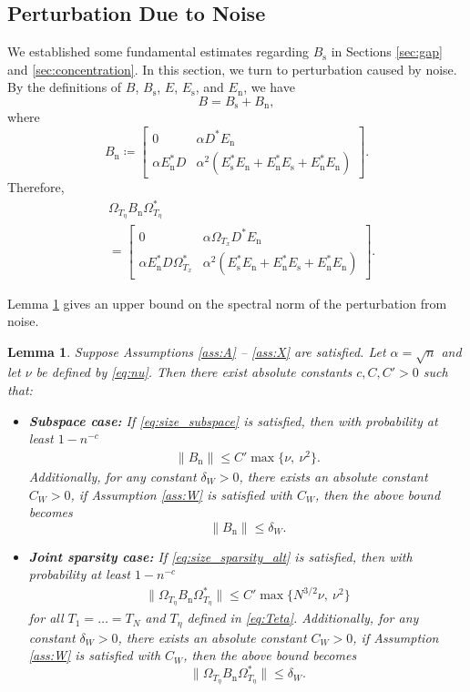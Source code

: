 \documentclass[11pt,journal]{IEEEtran}
\newcommand{\rms}{\mathrm{s}}
\newcommand{\rmn}{\mathrm{n}}
\newcommand{\norm}[1]{\|{#1}\|}
\newtheorem{lemma}[theorem]{Lemma}
\begin{document}
\subsection{Perturbation Due to Noise} \label{sec:noise}

We established some fundamental estimates regarding $B_\rms$ in Sections \ref{sec:gap} and \ref{sec:concentration}. In this section, we turn to perturbation caused by noise. By the definitions of $B$, $B_\rms$, $E$, $E_\rms$, and $E_\rmn$, we have
\[
B = B_\rms + B_\rmn,
\]
where
\[
B_\rmn \coloneqq 
\begin{bmatrix}
0 & \alpha D^* E_\rmn \\
\alpha E_\rmn^*D & \alpha^2 (E_\rms^*E_\rmn + E_\rmn^* E_\rms + E_\rmn^* E_\rmn)
\end{bmatrix}.
\]
Therefore,
\begin{align*}
& \Omega_{T_\eta}B_\rmn \Omega_{T_\eta}^* \\
& = \begin{bmatrix}
0 & \alpha \Omega_{T_x} D^* E_\rmn \\
\alpha E_\rmn^*D \Omega_{T_x}^* & \alpha^2 (E_\rms^*E_\rmn + E_\rmn^* E_\rms + E_\rmn^* E_\rmn)
\end{bmatrix}.
\end{align*}

Lemma \ref{lem:Bn} gives an upper bound on the spectral norm of the perturbation from noise.

\begin{lemma} \label{lem:Bn}
Suppose Assumptions \ref{ass:A} -- \ref{ass:X} are satisfied. Let $\alpha =\sqrt{n}$ and let $\nu$ be defined by \eqref{eq:nu}. Then there exist absolute constants $c,C,C'>0$ such that:
\begin{itemize}
	\item \textbf{Subspace case:} If  \eqref{eq:size_subspace} is satisfied, then with probability at least $1 - n^{-c}$
\begin{align*}
\norm{B_\rmn} \leq C' \max \{\nu,~\nu^2 \}.
\end{align*}
Additionally, for any constant $\delta_W >0$, there exists an absolute constant $C_W>0$, if Assumption \ref{ass:W} is satisfied with $C_W$, then the above bound becomes
\[
\norm{B_\rmn} \leq \delta_W.
\]

	\item \textbf{Joint sparsity case:} If \eqref{eq:size_sparsity_alt} is satisfied, then with probability at least $1 - n^{-c}$
\begin{align*}
\norm{\Omega_{T_\eta} B_\rmn \Omega_{T_\eta}^*} \leq C' \max \{N^{3/2}\nu,~\nu^2 \}
\end{align*}
for all $T_1=\dots = T_N$ and $T_\eta$ defined in \eqref{eq:Teta}. Additionally, for any constant $\delta_W >0$, there exists an absolute constant $C_W>0$, if Assumption \ref{ass:W} is satisfied with $C_W$, then the above bound becomes
\[
\norm{\Omega_{T_\eta}B_\rmn \Omega_{T_\eta}^*} \leq \delta_W.
\]
\end{itemize}

\end{lemma}
\end{document}
